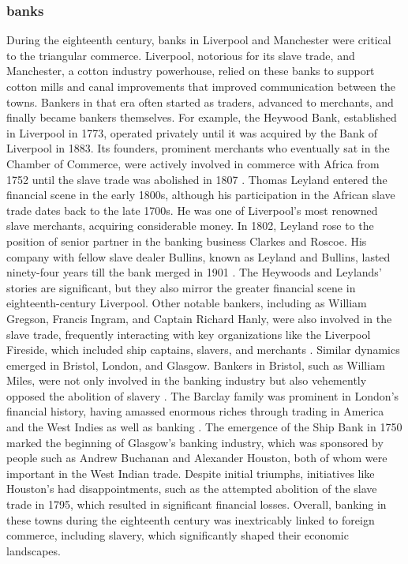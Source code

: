 \subsubsection{banks}
During the eighteenth century, banks in Liverpool and Manchester were critical to the triangular commerce. Liverpool, notorious for its slave trade, and Manchester, a cotton industry powerhouse, relied on these banks to support cotton mills and canal improvements that improved communication between the towns. Bankers in that era often started as traders, advanced to merchants, and finally became bankers themselves. For example, the Heywood Bank, established in Liverpool in 1773, operated privately until it was acquired by the Bank of Liverpool in 1883. Its founders, prominent merchants who eventually sat in the Chamber of Commerce, were actively involved in commerce with Africa from 1752 until the slave trade was abolished in 1807 . Thomas Leyland entered the financial scene in the early 1800s, although his participation in the African slave trade dates back to the late 1700s. He was one of Liverpool's most renowned slave merchants, acquiring considerable money. In 1802, Leyland rose to the position of senior partner in the banking business Clarkes and Roscoe. His company with fellow slave dealer Bullins, known as Leyland and Bullins, lasted ninety-four years till the bank merged in 1901 . The Heywoods and Leylands' stories are significant, but they also mirror the greater financial scene in eighteenth-century Liverpool. Other notable bankers, including as William Gregson, Francis Ingram, and Captain Richard Hanly, were also involved in the slave trade, frequently interacting with key organizations like the Liverpool Fireside, which included ship captains, slavers, and merchants . Similar dynamics emerged in Bristol, London, and Glasgow. Bankers in Bristol, such as William Miles, were not only involved in the banking industry but also vehemently opposed the abolition of slavery . The Barclay family was prominent in London's financial history, having amassed enormous riches through trading in America and the West Indies as well as banking . The emergence of the Ship Bank in 1750 marked the beginning of Glasgow's banking industry, which was sponsored by people such as Andrew Buchanan and Alexander Houston, both of whom were important in the West Indian trade. Despite initial triumphs, initiatives like Houston's had disappointments, such as the attempted abolition of the slave trade in 1795, which resulted in significant financial losses. Overall, banking in these towns during the eighteenth century was inextricably linked to foreign commerce, including slavery, which significantly shaped their economic landscapes.
